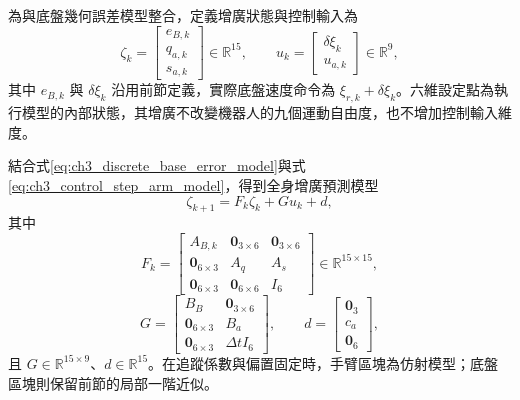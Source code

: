 為與底盤幾何誤差模型整合，定義增廣狀態與控制輸入為
\begin{equation}
    \zeta_k=
    \begin{bmatrix}
        e_{B,k} \\
        q_{a,k} \\
        s_{a,k}
    \end{bmatrix}
    \in\mathbb{R}^{15},
    \qquad
    u_k=
    \begin{bmatrix}
        \delta\xi_k \\
        u_{a,k}
    \end{bmatrix}
    \in\mathbb{R}^{9},
    \label{eq:ch3_augmented_state_input}
\end{equation}
其中 $e_{B,k}$ 與 $\delta\xi_k$ 沿用前節定義，實際底盤速度命令為 $\xi_{r,k}+\delta\xi_k$。六維設定點為執行模型的內部狀態，其增廣不改變機器人的九個運動自由度，也不增加控制輸入維度。

結合式\eqref{eq:ch3_discrete_base_error_model}與式\eqref{eq:ch3_control_step_arm_model}，得到全身增廣預測模型
\begin{equation}
    \zeta_{k+1}=F_k\zeta_k+G u_k+d,
    \label{eq:ch3_augmented_prediction_dynamics}
\end{equation}
其中
\begin{equation}
    F_k=
    \begin{bmatrix}
        A_{B,k} & \mathbf{0}_{3\times6} & \mathbf{0}_{3\times6} \\
        \mathbf{0}_{6\times3} & A_q & A_s \\
        \mathbf{0}_{6\times3} & \mathbf{0}_{6\times6} & I_6
    \end{bmatrix}
    \in\mathbb{R}^{15\times15},
    \label{eq:ch3_augmented_state_matrix}
\end{equation}
\begin{equation}
    G=
    \begin{bmatrix}
        B_B & \mathbf{0}_{3\times6} \\
        \mathbf{0}_{6\times3} & B_a \\
        \mathbf{0}_{6\times3} & \Delta t I_6
    \end{bmatrix},
    \qquad
    d=
    \begin{bmatrix}
        \mathbf{0}_{3} \\
        c_a \\
        \mathbf{0}_{6}
    \end{bmatrix},
    \label{eq:ch3_augmented_input_bias}
\end{equation}
且 $G\in\mathbb{R}^{15\times9}$、$d\in\mathbb{R}^{15}$。在追蹤係數與偏置固定時，手臂區塊為仿射模型；底盤區塊則保留前節的局部一階近似。

